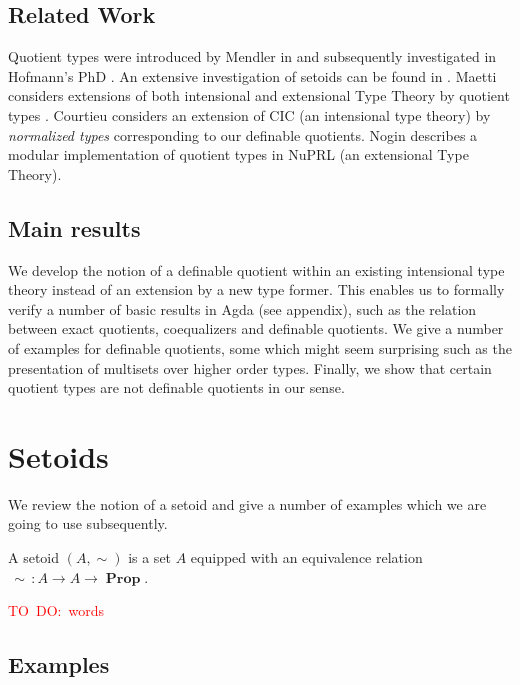 \documentclass[envcountsame]{llncs}
\newcommand{\todo}[1]{\textcolor{red}{TO~DO:~#1}}
\DeclareMathOperator{\Prop}{\mathbf{Prop}}
\begin{document}

\subsection{Related Work}
\label{sec:related-work}

Quotient types were introduced by Mendler in
\cite{mendler1990quotient} and subsequently investigated in Hofmann's
PhD \cite{hofmann1995thesis}. An extensive investigation of setoids
can be found in \cite{barthe2003setoids}. Maetti considers extensions of both
intensional and extensional Type Theory by quotient types
\cite{maietti1999effective}. Courtieu considers an extension of CIC (an intensional
type theory) by \emph{normalized types} corresponding to our definable
quotients. Nogin describes a modular implementation of quotient types
in NuPRL (an extensional Type Theory).

\subsection{Main results}
\label{sec:main-results}

We develop the notion of a definable quotient within an existing
intensional type theory instead of an extension by a new type former. 
This enables us to formally verify a number of basic results in Agda
(see appendix), such as the relation between exact quotients,
coequalizers and definable quotients. We give a number of examples for
definable quotients, some which might seem surprising such as the presentation
of multisets over higher order types. Finally, we show that certain
quotient types are not definable quotients in our sense. 

\section{Setoids}\label{sec:setoids}

We review the notion of a setoid and give a number of examples which
we are going to use subsequently.

\begin{definition}
A setoid $(A,\sim)$ is a set $A$ equipped with an equivalence relation ${\,\sim\,}\colon A \to A \to \Prop$.
\end{definition}
\todo{words}
\subsection{Examples}\label{sec:setoids:examples}
\end{document}
